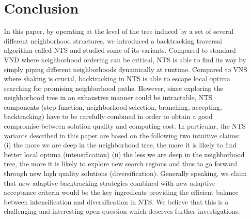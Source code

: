 \documentclass{acm_proc_article-sp}
\begin{document}
\section{Conclusion}
\label{sec:conc}
In this paper, by operating at the level of the tree induced by a set of several different neighborhood structures, we introduced a backtracking traversal algorithm called NTS and studied some of its variants. Compared to standard VND where neighborhood ordering can be critical, NTS is able to find its way by simply piping different neighborhoods dynamically at runtime. Compared to VNS where shaking is crucial, backtracking in NTS is able to escape local optima searching for promising neighborhood paths. However, since exploring the neighborhood tree in an exhaustive manner could be intractable, NTS components (step function, neighborhood selection, branching, accepting, backtracking) have to be carefully combined in order to obtain a good compromise between solution quality and computing cost. In particular, the NTS variants described in this paper are based on the following two intuitive claims: (i) the more we are deep in the neighborhood tree, the more it is likely to find better local optima (intensification) (ii) the less we are deep in the neighborhood tree, the more it is likely to explore new search regions and thus to go forward through new high quality solutions (diversification). Generally speaking, we claim that new adaptive backtracking strategies combined with new adaptive acceptance criteria would be the key ingredients providing the efficient balance between intensification and diversification in NTS. We believe that this is a challenging and interesting open question which deserves further investigations.









\balancecolumns
\end{document}
